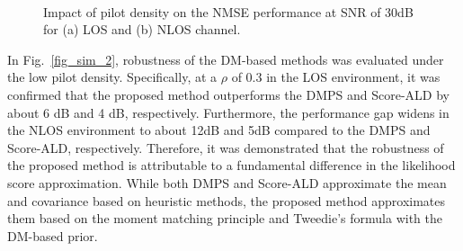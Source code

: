\documentclass[lettersize,journal]{IEEEtran}
\begin{document}
\begin{figure}[!t]
\\
\caption{Impact of pilot density on the NMSE performance at SNR of 30dB for (a) LOS and (b) NLOS channel.}
\label{fig_sim_1}
\end{figure}

In Fig.~\ref{fig_sim_2}, robustness of the DM-based methods was evaluated under the low pilot density. Specifically, at a $\rho$ of 0.3 in the LOS environment, it was confirmed that the proposed method outperforms the DMPS and Score-ALD by about 6 dB and 4 dB, respectively. Furthermore, the performance gap widens in the NLOS environment to about 12dB and 5dB compared to the DMPS and Score-ALD, respectively. Therefore, it was demonstrated that the robustness of the proposed method is attributable to a fundamental difference in the likelihood score approximation. While both DMPS and Score-ALD approximate the mean and covariance based on heuristic methods, the proposed method approximates them based on the moment matching principle and Tweedie's formula with the DM-based prior.
\end{document}
